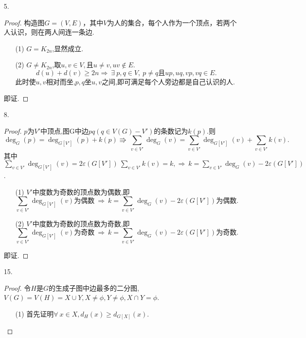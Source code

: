 \documentclass{article}
\begin{document}
\begin{enumerate}
\begin{proof}
        体中至少有两个人朋友数相同.
    \end{proof}
    \item [5.]
    \begin{proof}
        构造图$G=(V,E)$，其中$V$为人的集合，每个人作为一个顶点，若两个人认识，则在两人间连一条边.
        \begin{enumerate}
            \item [(1)]$G=K_{2n}$,显然成立.
            \item [(2)]$G\neq K_{2n}$,取$u,v\in V,\mbox{且}u\neq v,uv\notin E$.
            \[d(u)+d(v)\geq 2n \Rightarrow\ \exists\ p,q\in V,\ p\neq q\mbox{且}up,uq,vp,vq\in E.\]
            此时使$u,v$相对而坐,$p,q$坐$u,v$之间,即可满足每个人旁边都是自己认识的人.
        \end{enumerate}
        即证.
    \end{proof}
    \item [8.]\begin{proof}
       $p$为$V'$中顶点,图G中边$pq\left(q\in V(G)- V'\right)$的条数记为$k(p)$.则
        \[
            \deg_{G}(p)=\deg_{G[V']}(p)+k(p) \Rrightarrow\ \sum\limits_{v\in V'}\deg_{G}(v)=\sum\limits_{v\in V'} \deg_{G[V']}(v)+\sum\limits_{v\in V'} k(v).
        \]
        其中$\sum\limits_{v\in V'} \deg_{G[V']} (v)=2\varepsilon \left(G[V']\right)\ \sum\limits_{v\in V'} k(v)=k, \Rightarrow\ k=\sum\limits_{v\in V'}\deg_{G} (v)-2\varepsilon \left(G[V']\right)$.
        \begin{enumerate}
            \item [(1)]$V'$中度数为奇数的顶点数为偶数,即
            \[
                \sum\limits_{v\in V'}\deg_{G[V']} (v)\mbox{为偶数}\ \Rightarrow\ k=\sum\limits_{v\in V'}\deg_{G} (v)-2\varepsilon \left(G[V']\right)\mbox{为偶数}.
            \]
            \item [(2)]$V'$中度数为奇数的顶点数为奇数,即
            \[
                \sum\limits_{v\in V'}\deg_{G[V']} (v)\mbox{为奇数}\ \Rightarrow\ k=\sum\limits_{v\in V'}\deg_{G} (v)-2\varepsilon \left(G[V']\right)\mbox{为奇数}.
            \]
        \end{enumerate}
        即证.
    \end{proof}
    \item [15.]\begin{proof}
        令$H$是$G$的生成子图中边最多的二分图,$V(G)=V(H)=X\cup Y,X\neq \phi,Y\neq \phi,X\cap Y=\phi$.
        \begin{enumerate}
            \item [(1)]首先证明$\forall\ x\in X,d_{H}(x)\geqslant d_{G[X]} (x)$.
            

\end{enumerate}
\end{proof}
\end{enumerate}
\end{document}
